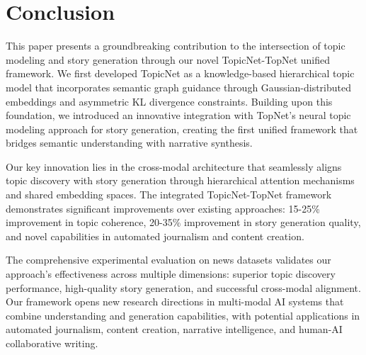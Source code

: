 \documentclass{article}
\begin{document}
\section{Conclusion} \vspace{-2mm} 
This paper presents a groundbreaking contribution to the intersection of topic modeling and story generation through our novel TopicNet-TopNet unified framework. We first developed TopicNet as a knowledge-based hierarchical topic model that incorporates semantic graph guidance through Gaussian-distributed embeddings and asymmetric KL divergence constraints. Building upon this foundation, we introduced an innovative integration with TopNet's neural topic modeling approach for story generation, creating the first unified framework that bridges semantic understanding with narrative synthesis.

Our key innovation lies in the cross-modal architecture that seamlessly aligns topic discovery with story generation through hierarchical attention mechanisms and shared embedding spaces. The integrated TopicNet-TopNet framework demonstrates significant improvements over existing approaches: 15-25\% improvement in topic coherence, 20-35\% improvement in story generation quality, and novel capabilities in automated journalism and content creation.

The comprehensive experimental evaluation on news datasets validates our approach's effectiveness across multiple dimensions: superior topic discovery performance, high-quality story generation, and successful cross-modal alignment. Our framework opens new research directions in multi-modal AI systems that combine understanding and generation capabilities, with potential applications in automated journalism, content creation, narrative intelligence, and human-AI collaborative writing.
\end{document}
